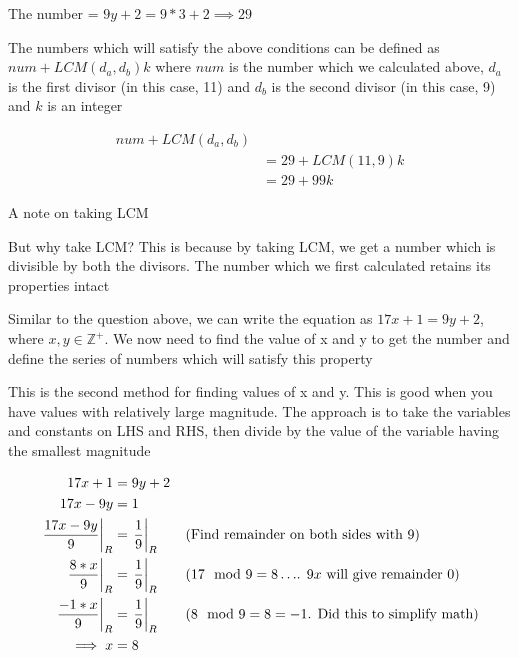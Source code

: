 The number = $9y + 2 = 9*3 + 2 \implies 29$

The numbers which will satisfy the above conditions can be defined as $num + LCM(d_a,d_b) k$ where $num$ is the number which we calculated above, $d_a$ is the first divisor (in this case, 11) and $d_b$ is the second divisor (in this case, 9) and $k$ is an integer

\begin{align*}
    num + LCM(d_a,d_b) \\
    &= 29 + LCM(11,9) k \\ 
    &= 29 + 99k     
\end{align*}

A note on taking LCM

\begin{EXTRA-LEARNING}
    But why take LCM? This is because by taking LCM, we get a number which is divisible by both the divisors. The number which we first calculated retains its properties intact
\end{EXTRA-LEARNING}


Similar to the question above, we can write the equation as $17x + 1 = 9y + 2$, where $x,y \in \mathbb{Z^{+}}$. We now need to find the value of x and y to get the number and define the series of numbers which will satisfy this property

\begin{NOTE}
    This is the second method for finding values of x and y. This is good when you have values with relatively large magnitude. The approach is to take the variables and constants on LHS and RHS, then divide by the value of the variable having the smallest magnitude
\end{NOTE}

\begin{align*}
    17x + 1 &= 9y + 2 \\
    17x - 9y &= 1 \\
    \displaystyle{ \left. \frac{17x - 9y}{9} \right |_{R} } &= \displaystyle{ \left. \frac{1}{9} \right |_{R} } \tag{Find remainder on both sides with 9} \\
    \displaystyle{ \left. \frac{8 * x}{9} \right |_{R} } &= \displaystyle{ \left. \frac{1}{9} \right |_{R} } \tag{$17 \mod 9 = 8 \ldots$. $9x$ will give remainder 0} \\
    \displaystyle{ \left. \frac{-1 * x}{9} \right |_{R} } &= \displaystyle{ \left. \frac{1}{9} \right |_{R} } \tag{$8 \mod 9 = 8 = -1$. Did this to simplify math} \\
    \implies x &= 8 
\end{align*}

